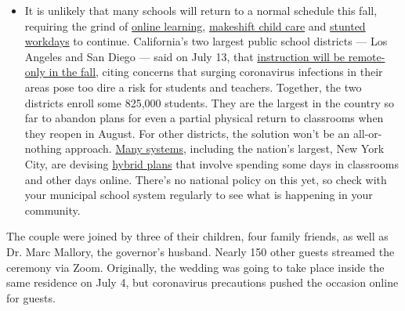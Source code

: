 \begin{itemize}
  \begin{itemize}
  \tightlist
  \item
    It is unlikely that many schools will return to a normal schedule
    this fall, requiring the grind of
    \href{https://www.nytimes.com/2020/06/05/us/coronavirus-education-lost-learning.html?action=click\&pgtype=Article\&state=default\&region=MAIN_CONTENT_3\&context=storylines_faq}{online
    learning},
    \href{https://www.nytimes.com/2020/05/29/us/coronavirus-child-care-centers.html?action=click\&pgtype=Article\&state=default\&region=MAIN_CONTENT_3\&context=storylines_faq}{makeshift
    child care} and
    \href{https://www.nytimes.com/2020/06/03/business/economy/coronavirus-working-women.html?action=click\&pgtype=Article\&state=default\&region=MAIN_CONTENT_3\&context=storylines_faq}{stunted
    workdays} to continue. California's two largest public school
    districts --- Los Angeles and San Diego --- said on July 13, that
    \href{https://www.nytimes.com/2020/07/13/us/lausd-san-diego-school-reopening.html?action=click\&pgtype=Article\&state=default\&region=MAIN_CONTENT_3\&context=storylines_faq}{instruction
    will be remote-only in the fall}, citing concerns that surging
    coronavirus infections in their areas pose too dire a risk for
    students and teachers. Together, the two districts enroll some
    825,000 students. They are the largest in the country so far to
    abandon plans for even a partial physical return to classrooms when
    they reopen in August. For other districts, the solution won't be an
    all-or-nothing approach.
    \href{https://bioethics.jhu.edu/research-and-outreach/projects/eschool-initiative/school-policy-tracker/}{Many
    systems}, including the nation's largest, New York City, are
    devising
    \href{https://www.nytimes.com/2020/06/26/us/coronavirus-schools-reopen-fall.html?action=click\&pgtype=Article\&state=default\&region=MAIN_CONTENT_3\&context=storylines_faq}{hybrid
    plans} that involve spending some days in classrooms and other days
    online. There's no national policy on this yet, so check with your
    municipal school system regularly to see what is happening in your
    community.
  \end{itemize}
\end{itemize}

The couple were joined by three of their children, four family friends,
as well as Dr. Marc Mallory, the governor's husband. Nearly 150 other
guests streamed the ceremony via Zoom. Originally, the wedding was going
to take place inside the same residence on July 4, but coronavirus
precautions pushed the occasion online for guests.

